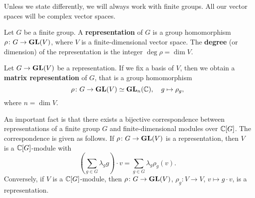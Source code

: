 \chapter{} 


Unless we state differently, we will always work
with finite groups. All our vector spaces will
be complex vector spaces. 

\begin{definition}
    Let $G$ be a finite group. A \textbf{representation}
    of $G$ is a group homomorphism $\rho\colon G\to\mathbf{GL}(V)$, where
    $V$ is a finite-dimensional vector space. The \textbf{degree} (or dimension) 
    of the representation is the integer $\deg\rho=\dim V$. 
\end{definition}

Let $G\to\mathbf{GL}(V)$ be a representation. 
If we fix a basis of $V$, then we obtain
a \textbf{matrix representation} of $G$, that is a 
group homomorphism 
\[
\rho\colon G\to\mathbf{GL}(V)\simeq\mathbf{GL}_n(\mathbb{C}),
\quad 
g\mapsto\rho_g,
\]
where
$n=\dim V$. 

\begin{example}
\end{example}

\begin{example}
\end{example}

\begin{example}
\end{example}

\begin{example}
\end{example}

\begin{example}
\end{example}

\begin{example}
\end{example}

An important fact is that there exists a bijective
correspondence 
between 
representations of a finite group $G$ 
and 
finite-dimensional modules over $\mathbb{C}[G]$. The correspondence
is given as follows. If $\rho\colon G\to\mathbf{GL}(V)$ is a representation, 
then $V$ is a $\mathbb{C}[G]$-module with
\[
\left(\sum_{g\in G}\lambda_gg\right)\cdot v=\sum_{g\in G}\lambda_g\rho_g(v).
\]
Conversely, if $V$ is a $\mathbb{C}[G]$-module, then
$\rho\colon G\to\mathbf{GL}(V)$, $\rho_g\colon V\to V$, $v\mapsto g\cdot v$, 
is a representation. 

